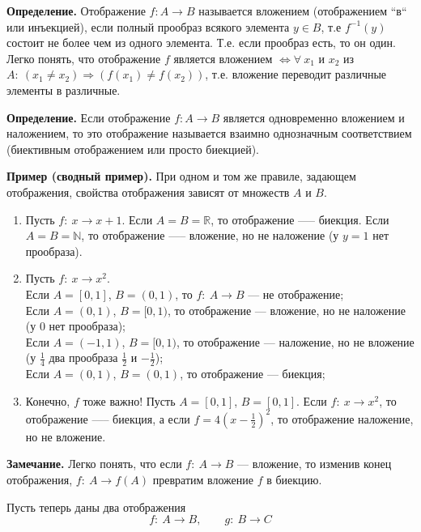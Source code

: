 \documentclass{article}
\begin{document}
    \textbf{Определение.} Отображение $f: A \rightarrow B$ называется вложением (отображением ``в`` или инъекцией), если полный прообраз всякого элемента $y \in B$, т.е $f^{-1}(y)$ состоит не более чем из одного элемента. Т.е. если прообраз есть, то он один. Легко понять, что отображение $f$ является вложением $\Leftrightarrow \forall\ x_1$ и $x_2$ из $A:\ (x_1 \neq x_2) \Rightarrow (f(x_1) \neq f(x_2))$, т.е. вложение переводит различные элементы в различные.

    \textbf{Определение.} Если отображение $f: A \rightarrow B$ является одновременно вложением и наложением, то это отображение называется взаимно однозначным соответствием (биективным отображением или просто биекцией).

    \textbf{Пример (сводный пример).} При одном и том же правиле, задающем отображения, свойства отображения зависят от множеств $A$ и $B$.

    \begin{enumerate}
        \item Пусть $f:\ x \rightarrow x + 1$. Если $A = B = \mathbb{R}$, то отображение —-- биекция. Если $A = B = \mathbb{N}$, то отображение —-- вложение, но не наложение (у $y = 1$ нет прообраза).
        \item Пусть $f:\ x \rightarrow x^2$.\\
        Если $A = [0, 1]$, $B = (0, 1)$, то $f:\ A \rightarrow B$ --- не отображение;\\
        Если $A = (0, 1)$, $B = [0, 1)$, то отображение --- вложение, но не наложение (у $0$ нет прообраза);\\
        Если $A = (-1, 1)$, $B = [0, 1)$, то отображение --- наложение, но не вложение (у $\frac{1}{4}$ два прообраза $\frac{1}{2}$ и $-\frac{1}{2}$);\\
        Если $A = (0, 1)$, $B = (0, 1)$, то отображение --- биекция;
        \item Конечно, $f$ тоже важно! Пусть $A = [0, 1]$, $B = [0, 1]$. Если $f:\ x \rightarrow x^2$, то отображение —-- биекция, а если $f = 4(x - \frac{1}{2})^2$, то отображение наложение, но не вложение.
    \end{enumerate}

    \textbf{Замечание.} Легко понять, что если $f:\ A \rightarrow B$ --- вложение, то изменив конец отображения, $f:\ A \rightarrow f(A)$ превратим вложение $f$ в биекцию.

    Пусть теперь даны два отображения
    \[f:\ A \rightarrow B,\qquad g:\ B \rightarrow C\]
\end{document}
